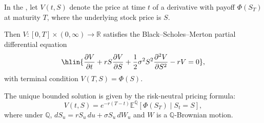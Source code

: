 \begin{theorem} \label{theorem:black_scholes_merton_pde_for_option_prices}
In the , let $V(t, S)$ denote the price at time $t$ of a derivative with payoff $\Phi(S_T)$ at maturity $T$, where the underlying stock price is $S$.

Then $V: [0, T] \times (0, \infty) \to \mathbb{R}$ satisfies the Black--Scholes--Merton partial differential equation
$$\hlin{\frac{\partial V}{\partial t} + rS \frac{\partial V}{\partial S} + \frac{1}{2}\sigma^2 S^2 \frac{\partial^2 V}{\partial S^2} - rV = 0},$$
with terminal condition $V(T, S) = \Phi(S)$.

The unique bounded solution is given by the risk-neutral pricing formula:
$$V(t, S) = e^{-r(T-t)} \mathbb{E}^{\mathbb{Q}}\left[\Phi(S_T) \;\big|\; S_t = S\right],$$
where under $\mathbb{Q}$, $dS_u = r S_u \, du + \sigma S_u \, dW_u$ and $W$ is a $\mathbb{Q}$-Brownian motion.
\end{theorem}
